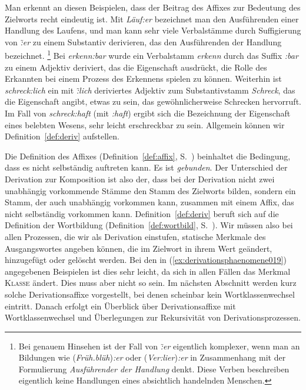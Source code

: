 Man erkennt an diesen Beispielen, dass der Beitrag des Affixes zur Bedeutung des Zielworts recht eindeutig ist.
Mit \textit{Läuf:er} bezeichnet man den Ausführenden einer Handlung des Laufens, und man kann sehr viele Verbalstämme durch Suffigierung von \textit{\~:er} zu einem Substantiv derivieren, das den Ausführenden der Handlung bezeichnet.%
\footnote{Bei genauem Hinsehen ist der Fall von \textit{\~:er} eigentlich komplexer, wenn man an Bildungen wie (\textit{Früh.blüh})\textit{:er} oder (\textit{Ver:lier})\textit{:er} in Zusammenhang mit der Formulierung \textit{Ausführender der Handlung} denkt.
Diese Verben beschreiben eigentlich keine Handlungen eines absichtlich handelnden Menschen.}
Bei \textit{erkenn:bar} wurde ein Verbalstamm \textit{erkenn} durch das Suffix \textit{:bar} zu einem Adjektiv deriviert, das die Eigenschaft ausdrückt, die Rolle des Erkannten bei einem Prozess des Erkennens spielen zu können.
Weiterhin ist \textit{schreck:lich} ein mit \textit{\~:lich} deriviertes Adjektiv zum Substantivstamm \textit{Schreck}, das die Eigenschaft angibt, etwas zu sein, das gewöhnlicherweise Schrecken hervorruft.
Im Fall von \textit{schreck:haft} (mit \textit{:haft}) ergibt sich die Bezeichnung der Eigenschaft eines belebten Wesens, sehr leicht erschreckbar zu sein.
Allgemein können wir Definition~\ref{def:deriv} aufstellen.


Die Definition des Affixes (Definition~\ref{def:affix}, S.~\pageref{def:affix}) beinhaltet die Bedingung, dass es nicht selbständig auftreten kann.
Es ist \textit{gebunden}.
Der Unterschied der Derivation zur Komposition ist also der, dass bei der Derivation nicht zwei unabhängig vorkommende Stämme den Stamm des Zielworts bilden, sondern ein Stamm, der auch unabhängig vorkommen kann, zusammen mit einem Affix, das nicht selbständig vorkommen kann.
Definition~\ref{def:deriv} beruft sich auf die Definition der Wortbildung (Definition~\ref{def:wortbild}, S.~\pageref{def:wortbild}).
Wir müssen also bei allen Prozessen, die wir als Derivation einstufen, statische Merkmale des Ausgangswortes angeben können, die im Zielwort in ihrem Wert geändert, hinzugefügt oder gelöscht werden.
Bei den in (\ref{ex:derivationsphaenomene019}) angegebenen Beispielen ist dies sehr leicht, da sich in allen Fällen das Merkmal \textsc{Klasse} ändert.
Dies muss aber nicht so sein.
Im nächsten Abschnitt werden kurz solche Derivationsaffixe vorgestellt, bei denen scheinbar kein Wortklassenwechsel eintritt.
Danach erfolgt ein Überblick über Derivationsaffixe mit Wortklassenwechsel und Überlegungen zur Rekursivität von Derivationsprozessen.

